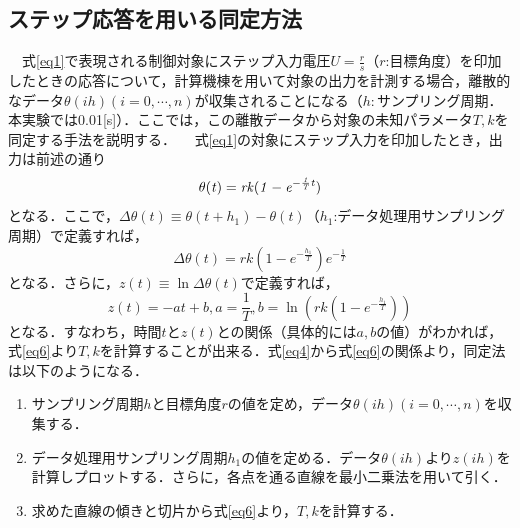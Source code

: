 \documentclass[11pt,a4paper]{jsarticle}
\begin{document}
  \subsection{ステップ応答を用いる同定方法}
  　式\ref{eq1}で表現される制御対象にステップ入力電圧$U = \frac{r}{s}$（$r$:目標角度）を印加したときの応答について，計算機棟を用いて対象の出力を計測する場合，離散的なデータ$\theta(ih) (i = 0,\cdots,n)$が収集されることになる（$h:$サンプリング周期．本実験では0.01[s]）．ここでは，この離散データから対象の未知パラメータ$T,k$を同定する手法を説明する．
  　式\ref{eq1}の対象にステップ入力を印加したとき，出力は前述の通り
  \begin{equation}
 \it{\theta(t)} = rk(1-e^{-\frac{1}{T}t})
  \label{eq4}
  \end{equation}
  となる．ここで，$\Delta \theta(t) \equiv \theta(t + h_1)-\theta(t)$（$h_1$:データ処理用サンプリング周期）で定義すれば，
  \begin{equation}
   \Delta \theta(t) = rk(1-e^{-\frac{h_1}{T}})e^{-\frac{1}{T}}
    \label{eq5}
  \end{equation}
  となる．さらに，$z(t) \equiv \ln \Delta \theta(t)$で定義すれば，
  \begin{equation}
   z(t) = -at+b, a = \frac{1}{T}, b = \ln(rk(1-e^{-\frac{h_1}{T}}))
   \label{eq6} 
  \end{equation}
  となる．すなわち，時間$t$と$z(t)$との関係（具体的には$a,b$の値）がわかれば，式\ref{eq6}より$T,k$を計算することが出来る．式\ref{eq4}から式\ref{eq6}の関係より，同定法は以下のようになる．
  \begin{enumerate}
   \item サンプリング周期$h$と目標角度$r$の値を定め，データ$\theta(ih) (i = 0,\cdots,n)$を収集する．
   \item データ処理用サンプリング周期$h_1$の値を定める．データ$\theta(ih)$より$z(ih)$を計算しプロットする．さらに，各点を通る直線を最小二乗法を用いて引く．
   \item 求めた直線の傾きと切片から式\ref{eq6}より，$T,k$を計算する．
  \end{enumerate}
\end{document}
